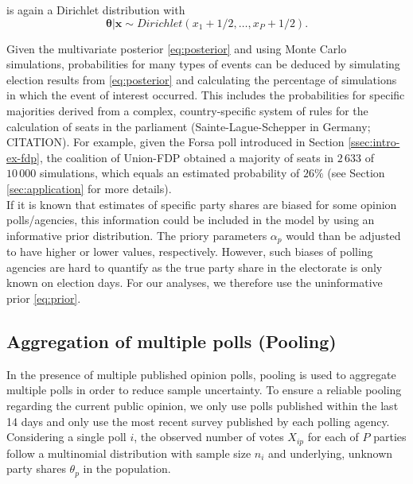 \documentclass[smallcondensed]{svjour3}     %
\begin{document}
is again a Dirichlet distribution with
\begin{equation}\label{eq:posterior}
\boldsymbol{\theta}|\mathbf{x} \sim Dirichlet(x_1 + 1/2,\ldots, x_P + 1/2).
\end{equation}

Given the multivariate posterior \eqref{eq:posterior} and using Monte Carlo
simulations, probabilities for many types of events can be deduced by simulating
election results from \eqref{eq:posterior} and calculating the percentage of
simulations in which the event of interest occurred. This includes the
probabilities for specific majorities derived from a complex, country-specific
system of rules for the calculation of seats in the parliament
(Sainte-Lague-Schepper in Germany; CITATION). For example, given the Forsa poll
introduced in Section \ref{ssec:intro-ex-fdp}, the coalition of Union-FDP
obtained a majority of seats in $2\,633$ of $10\,000$ simulations, which equals
an estimated probability of $26\%$ (see Section \ref{sec:application} for
more details).\\

If it is known that estimates of specific party shares are biased for some opinion
polls/agencies, this information could be included in the model by using an
informative prior distribution. The priory parameters $\alpha_p$ would than
be adjusted to have higher or lower values, respectively.
However, such biases of polling agencies are hard to quantify as the true party
share in the electorate is only known on election days. For our analyses, we
therefore use the uninformative prior \eqref{eq:prior}.

\subsection{Aggregation of multiple polls (Pooling)} \label{ssec:pooling}
In the presence of multiple published opinion polls, pooling is used to
aggregate multiple polls in order to reduce sample uncertainty. To ensure a 
reliable pooling regarding the current public opinion, we only use polls 
published within the last 14 days and only use the most recent survey published by each polling agency.\\

Considering a single poll $i$, the observed number of votes $X_{ip}$ for each of
$P$ parties follow a multinomial distribution with sample size $n_i$ and underlying,
unknown party shares $\theta_p$ in the population.

\end{document}
